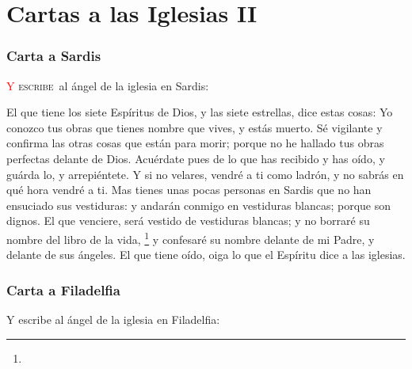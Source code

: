 \chapter{Cartas a las Iglesias II}
\subsection*{Carta a Sardis}
\lettrine[lines=3,slope=-0.5em,loversize=0.1]{\textcolor{red}{Y}}{\hspace{0.5em} escribe}\ al ángel de la iglesia en Sardis:

\zz El que tiene los siete Espíritus de Dios, y las siete estrellas, dice estas cosas: Yo conozco tus obras que tienes nombre que vives, y estás muerto. %
Sé vigilante y confirma las otras cosas que están para morir; porque no he hallado tus obras perfectas delante de Dios. %
Acuérdate pues de lo que has recibido y has oído, y guárda lo, y arrepiéntete. Y si no velares, vendré a ti como ladrón, y no sabrás en qué hora vendré a ti. %
Mas tienes unas pocas personas en Sardis que no han ensuciado sus vestiduras: y andarán conmigo en vestiduras blancas; porque son dignos. %
El que venciere, será vestido de vestiduras blancas; y no borraré su nombre del libro de la vida,%
	\footnote{ %
			}
 y confesaré su nombre delante de mi Padre, y delante de sus ángeles. %
El que tiene oído, oiga lo que el Espíritu dice a las iglesias.
\subsection*{Carta a Filadelfia}
Y escribe al ángel de la iglesia en Filadelfia:

